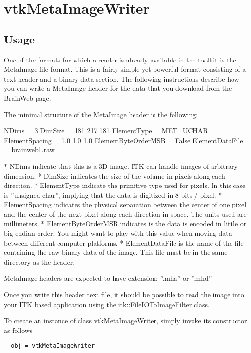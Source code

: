 \section{vtkMetaImageWriter}

\subsection{Usage}

 One of the formats for which a reader is already available in the toolkit is
 the MetaImage file format. This is a fairly simple yet powerful format
 consisting of a text header and a binary data section. The following
 instructions describe how you can write a MetaImage header for the data that
 you download from the BrainWeb page.

 The minimal structure of the MetaImage header is the following:

    NDims = 3
    DimSize = 181 217 181
    ElementType = MET\_UCHAR
    ElementSpacing = 1.0 1.0 1.0
    ElementByteOrderMSB = False
    ElementDataFile = brainweb1.raw

    * NDims indicate that this is a 3D image. ITK can handle images of
      arbitrary dimension.
    * DimSize indicates the size of the volume in pixels along each
      direction.
    * ElementType indicate the primitive type used for pixels. In this case
      is ''unsigned char'', implying that the data is digitized in 8 bits /
      pixel.
    * ElementSpacing indicates the physical separation between the center of
      one pixel and the center of the next pixel along each direction in space.
      The units used are millimeters.
    * ElementByteOrderMSB indicates is the data is encoded in little or big
      endian order. You might want to play with this value when moving data
      between different computer platforms.
    * ElementDataFile is the name of the file containing the raw binary data
      of the image. This file must be in the same directory as the header. 

 MetaImage headers are expected to have extension: ''.mha'' or ''.mhd''

 Once you write this header text file, it should be possible to read the
 image into your ITK based application using the itk::FileIOToImageFilter
 class.

To create an instance of class vtkMetaImageWriter, simply
invoke its constructor as follows
\begin{verbatim}
  obj = vtkMetaImageWriter
\end{verbatim}

